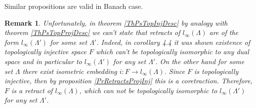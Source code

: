 \documentclass[12pt]{article}
\newtheorem{remark}[theorem]{Remark}
\begin{document}
Similar propositions are valid in Banach case.

\begin{remark} Unfortunately, in theorem \ref{ThPsTopInjDesc} by analogy with theorem  \ref{ThPsTopProjDesc} we can't state that retracts of $l_\infty(\Lambda)$ are of the form $l_\infty(\Lambda')$ for some set $\Lambda'$. Indeed, in \cite{RosInjLmuSp} corollary 4.4 it was shown existence of topologically injective space $F$ which can't be topologically isomorphic to any dual space and in particular to $l_\infty(\Lambda')$ for any set $\Lambda'$. On the other hand for some set $\Lambda$ there exist isometric embedding $i:F\to l_\infty(\Lambda)$. Since $F$ is topologically injective, then by proposition \ref{PrRetractsProjInj} this is a coretraction. Therefore, $F$ is a retract of $l_\infty(\Lambda)$, which can not be topologically isomorphic to $l_\infty(\Lambda')$ for any set $\Lambda'$.
\end{remark}
\end{document}
